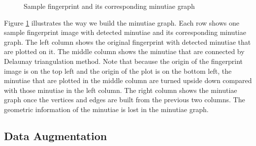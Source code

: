 \begin{figure}[!ht]
\begin{minipage}[b]{0.93\linewidth}
{\begin{minipage}[b]{0.27\linewidth}
            \end{minipage}
        }
    \end{minipage}
    \vfill
    \caption{Sample fingerprint and its corresponding minutiae graph}
    \label{fig:mnt}
\end{figure}

Figure \ref{fig:mnt} illustrates the way we build the minutiae graph. Each row shows one sample fingerprint image with detected minutiae and its corresponding minutiae graph. The left column shows the original fingerprint with detected minutiae that are plotted on it. The middle column shows the minutiae that are connected by Delaunay triangulation method. Note that because the origin of the fingerprint image is on the top left and the origin of the plot is on the bottom left, the minutiae that are plotted in the middle column are turned upside down compared with those minutiae in the left column. The right column shows the minutiae graph once the vertices and edges are built from the previous two columns. The geometric information of the minutiae is lost in the minutiae graph.


\subsection{Data Augmentation}

